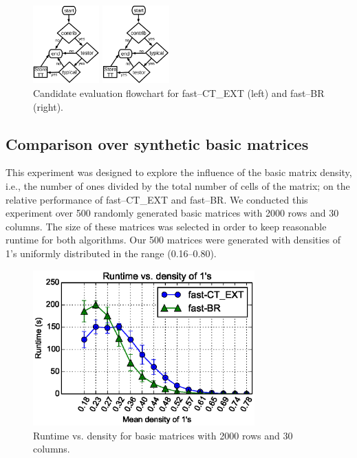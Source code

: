 \documentclass[citenumber]{llncs}
\begin{document}
	\begin{figure}[htb]
	    \centering
	    \begin{minipage}{.5\textwidth}
	        \centering
	        \includegraphics[height=3cm]{ct_ext.eps}
	    \end{minipage}%
	    \begin{minipage}{0.5\textwidth}
	        \centering
	        \includegraphics[height=3cm]{BR.eps}	        
	    \end{minipage}
		\caption{Candidate evaluation flowchart for fast--CT\_EXT (left) and fast--BR (right).}
		\label{fig:candeval}
	\end{figure}
	
%
\subsection{Comparison over synthetic basic matrices}
%
	This experiment was designed to explore the influence of the basic matrix density, i.e., the number of ones divided by the total number of cells of the matrix; on the relative performance of fast--CT\_EXT and fast--BR. We conducted this experiment over 500 randomly generated basic matrices with 2000 rows and 30 columns. The size of these matrices was selected in order to keep reasonable runtime for both algorithms. Our 500 matrices were generated with densities of 1's uniformly distributed in the range (0.16--0.80). 

	\begin{figure}[htb]
		\centering
		\includegraphics[height=6cm]{2000rows.eps}	        
		\caption{Runtime vs. density for basic matrices with 2000 rows and 30 columns.}
		\label{fig:density}
	\end{figure}
\end{document}
